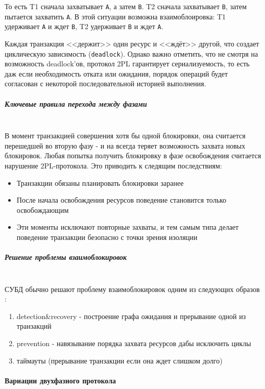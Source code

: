То есть T1 сначала захватывает \texttt{A}, а затем \texttt{B}. T2 сначала захватывает \texttt{B}, затем пытается захватить \texttt{A}.
В этой ситуации возможна взаимоблоировка: T1 удерживает \texttt{A} и ждет \texttt{B}, T2 удерживает \texttt{B} и ждет \texttt{A}.

Каждая транзакция <<держит>> один ресурс и <<ждёт>> другой, что создает циклическую зависимость (\texttt{deadlock}).
Однако важно отметить, что не смотря на возможность deadlock'ов, протокол 2PL гарантирует сериализуемость, то есть даж если необходимость отката или ожидания, порядок операций будет согласован с некоторой последовательной историей выполнения.

\subparagraph{Ключевые правила перехода между фазами} ~\\

 В момент транзакцией совершения хотя бы одной блокировки, она считается перешедшей во вторую фазу - и на всегда теряет возможность захвата новых блокировок. Любая попытка получить блокировку в фазе освобождения считается нарушение 2PL-протокола.
 Это приводить к следящим последствиям:
 \begin{itemize}
    \item Транзакции обязаны планировать блокировки заранее
    \item После начала освобождения ресурсов поведение становится только освобождающим
    \item Эти моменты исключают повторные захваты, и тем самым типа делает поведение транзакции безопасно с точки зрения изоляции \autocite[ch.22]{ElmasriNavathe}
 \end{itemize}

\subparagraph{Решение проблемы взаимоблокировок} ~\\

 СУБД обычно решают проблему взаимоблокировок одним из следующих образов \autocite{Silberschatz}:
 \begin{enumerate}
    \item detection\&recovery - построение графа ожидания и прерывание одной из транзакций
    \item prevention - навязывание порядка захвата ресурсов дабы исключить циклы
    \item таймауты (прерывание транзакции если она ждет слишком долго)
 \end{enumerate}

 \paragraph{Вариации двухфазного протокола} ~\\


